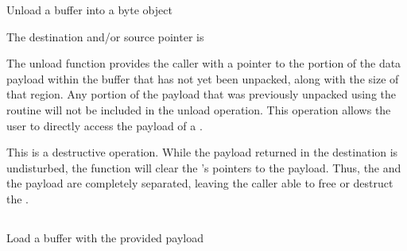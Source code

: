 \summary

Unload a buffer into a byte object

\format


\begin{arglist}
\end{arglist}

\returnstart
\begin{constantdesc}
\item {} The destination and/or source pointer is 
\end{constantdesc}
\returnend

\descr

The unload function provides the caller with a pointer to the
portion of the data payload within the buffer that has not yet been
unpacked, along with the size of that region. Any portion of
the payload that was previously unpacked using the 
routine will not be included in the unload operation. This operation allows the user to directly access the payload of a .

\adviceuserstart
This is a destructive operation. While the payload returned in the
destination  is
undisturbed, the function will clear the 's pointers to the
payload. Thus, the  and the payload are completely separated,
leaving the caller able to free or destruct the .
\adviceuserend



\subsection{}

\summary

Load a buffer with the provided payload

\format


